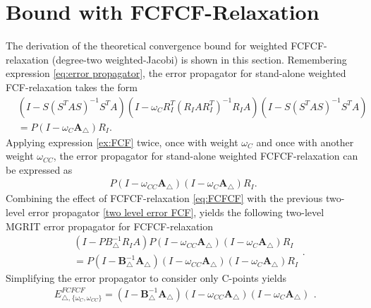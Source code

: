 \documentclass[VANCOUVER,STIX1COL]{WileyNJD-v2}
\begin{document}
\section{Bound with FCFCF-Relaxation} \label{app1}
The derivation of the theoretical convergence bound for weighted FCFCF-relaxation (degree-two weighted-Jacobi) is shown in this section.
%
Remembering expression \eqref{eq:error propagator}, the error propagator for stand-alone weighted FCF-relaxation takes the form
\begin{equation} \label{ex:FCF}
\begin{aligned}
&(I-S(S^TAS)^{-1}S^TA)(I-\omega_C R^T_I(R_IAR^T_I)^{-1}R_IA)(I-S(S^TAS)^{-1}S^TA)\\
&= P(I - \omega_C \mathbf{A}_{\triangle})R_I .
\end{aligned}
\end{equation}
Applying expression \eqref{ex:FCF} twice, once with weight $\omega_C$ and once with another weight $\omega_{CC}$, the error propagator for stand-alone weighted FCFCF-relaxation can be expressed as
\begin{equation}
\begin{aligned} \label{eq:FCFCF}
P(I - \omega_{CC} \mathbf{A}_{\triangle})(I - \omega_C \mathbf{A}_{\triangle})R_I .
\end{aligned}
\end{equation}
Combining the effect of FCFCF-relaxation \eqref{eq:FCFCF} with the previous two-level error propagator \eqref{two level error FCF}, yields the following two-level MGRIT error propagator for FCFCF-relaxation
\begin{equation}
\begin{aligned}
&(I-PB^{-1}_{\triangle}R_IA) P(I - \omega_{CC} \mathbf{A}_{\triangle})(I - \omega_C \mathbf{A}_{\triangle})R_I \\
&= P(I-\mathbf{B}_{\triangle}^{-1}\mathbf{A}_{\triangle})(I - \omega_{CC} \mathbf{A}_{\triangle})(I - \omega_C \mathbf{A}_{\triangle})R_I
\end{aligned}.
\end{equation}
Simplifying the error propagator to consider only C-points yields 
\begin{equation}
\begin{aligned}
E_{\triangle, \hspace{1pt} \{\omega_C,\omega_{CC}\}}^{FCFCF} = (I-\mathbf{B}_{\triangle}^{-1}\mathbf{A}_{\triangle})(I - \omega_{CC} \mathbf{A}_{\triangle})(I - \omega_C \mathbf{A}_{\triangle})
\end{aligned}.
\end{equation}
\end{document}
